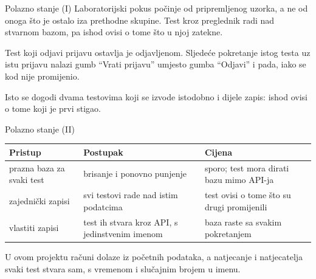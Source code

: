 \begin{frame}{Polazno stanje (I)}
Laboratorijski pokus počinje od pripremljenog uzorka, a ne od onoga što je ostalo iza prethodne skupine. Test kroz preglednik radi nad stvarnom bazom, pa ishod ovisi o tome što u njoj zatekne.

\vspace{0.9em}
Test koji odjavi prijavu ostavlja je odjavljenom. Sljedeće pokretanje istog testa uz istu prijavu nalazi gumb \enquote{Vrati prijavu} umjesto gumba \enquote{Odjavi} i pada, iako se kod nije promijenio.

\vspace{0.9em}
Isto se dogodi dvama testovima koji se izvode istodobno i dijele zapis: ishod ovisi o tome koji je prvi stigao.
\end{frame}


\begin{frame}{Polazno stanje (II)}
\vspace{0.3em}
\begin{center}
{\small
\setlength{\tabcolsep}{6pt}
\renewcommand{\arraystretch}{1.3}
\begin{tabular}{@{}L{4.2cm}L{3.6cm}L{4.0cm}@{}}
  \toprule
  \textbf{Pristup} & \textbf{Postupak} & \textbf{Cijena} \\
  \midrule
  prazna baza za svaki test & brisanje i ponovno punjenje & sporo; test mora dirati bazu mimo API-ja \\
  zajednički zapisi & svi testovi rade nad istim podatcima & test ovisi o tome što su drugi promijenili \\
  vlastiti zapisi & test ih stvara kroz API, s jedinstvenim imenom & baza raste sa svakim pokretanjem \\
  \bottomrule
\end{tabular}
}
\end{center}

\vspace{0.6em}
\begin{konvencija}
U ovom projektu računi dolaze iz početnih podataka, a natjecanje i natjecatelja svaki test stvara sam, s vremenom i slučajnim brojem u imenu.
\end{konvencija}
\end{frame}

